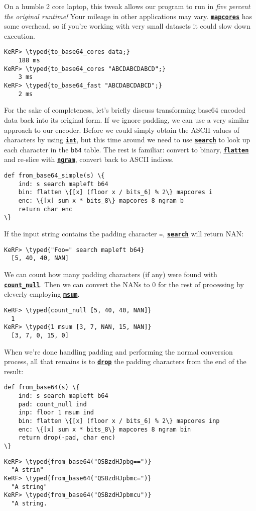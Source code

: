 \documentclass{article}
\newcommand{\typed}[1]{\textcolor{TealBlue}{#1}}
\newcommand{\primu}[2]{\hyperref[prim:#2]{\textbf{\texttt{#1}}}}
\newcommand{\prim}[1]{\primu{#1}{#1}}
\newcommand{\comb}[1]{\primu{#1}{#1}}
\begin{document}
On a humble 2 core laptop, this tweak allows our program to run in \emph{five percent the original runtime!} Your mileage in other applications may vary. \comb{mapcores} has some overhead, so if you're working with very small datasets it could slow down execution.
\begin{Verbatim}
KeRF> \typed{to_base64_cores data;}
    188 ms
KeRF> \typed{to_base64_cores "ABCDABCDABCD";}
    3 ms
KeRF> \typed{to_base64_fast "ABCDABCDABCD";}
    2 ms
\end{Verbatim}

\pagebreak
For the sake of completeness, let's briefly discuss transforming base64 encoded data back into its original form. If we ignore padding, we can use a very similar approach to our encoder. Before we could simply obtain the ASCII values of characters by using \prim{int}, but this time around we need to use \prim{search} to look up each character in the \texttt{b64} table. The rest is familiar: convert to binary, \prim{flatten} and re-slice with \prim{ngram}, convert back to ASCII indices.
\begin{Verbatim}
def from_base64_simple(s) \{
	ind: s search mapleft b64
	bin: flatten \{[x] (floor x / bits_6) % 2\} mapcores i
	enc: \{[x] sum x * bits_8\} mapcores 8 ngram b
	return char enc
\}
\end{Verbatim}

If the input string contains the padding character \texttt{=}, \prim{search} will return NAN:
\begin{Verbatim}
KeRF> \typed{"Foo=" search mapleft b64}
  [5, 40, 40, NAN]
\end{Verbatim}

We can count how many padding characters (if any) were found with \primu{count\_null}{countNull}. Then we can convert the NANs to 0 for the rest of processing by cleverly employing \prim{msum}.
\begin{Verbatim}
KeRF> \typed{count_null [5, 40, 40, NAN]}
  1
KeRF> \typed{1 msum [3, 7, NAN, 15, NAN]}
  [3, 7, 0, 15, 0]
\end{Verbatim}

When we're done handling padding and performing the normal conversion process, all that remains is to \prim{drop} the padding characters from the end of the result:
\begin{Verbatim}
def from_base64(s) \{
	ind: s search mapleft b64
	pad: count_null ind
	inp: floor 1 msum ind
	bin: flatten \{[x] (floor x / bits_6) % 2\} mapcores inp
	enc: \{[x] sum x * bits_8\} mapcores 8 ngram bin
	return drop(-pad, char enc)
\}
\end{Verbatim}
\begin{Verbatim}
KeRF> \typed{from_base64("QSBzdHJpbg==")}
  "A strin"
KeRF> \typed{from_base64("QSBzdHJpbmc=")}
  "A string"
KeRF> \typed{from_base64("QSBzdHJpbmcu")}
  "A string.
\end{Verbatim}
\end{document}
